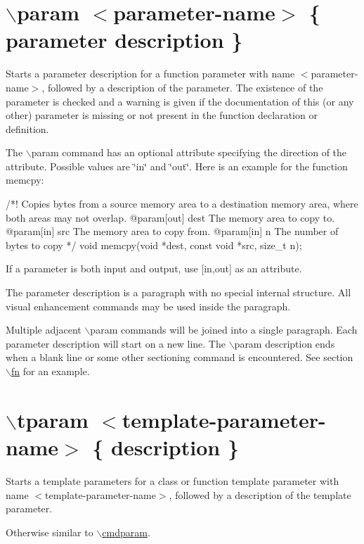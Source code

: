  \hypertarget{commands_cmdparam}{}\section{$\backslash$param $<$parameter-\/name$>$ \{ parameter description \}}\label{commands_cmdparam}
 Starts a parameter description for a function parameter with name $<$parameter-\/name$>$, followed by a description of the parameter. The existence of the parameter is checked and a warning is given if the documentation of this (or any other) parameter is missing or not present in the function declaration or definition.

The $\backslash$param command has an optional attribute specifying the direction of the attribute. Possible values are \char`\"{}in\char`\"{} and \char`\"{}out\char`\"{}. Here is an example for the function memcpy: 
\begin{DoxyCode}
/*!
 Copies bytes from a source memory area to a destination memory area,
 where both areas may not overlap.
 @param[out] dest The memory area to copy to.
 @param[in]  src  The memory area to copy from.
 @param[in]  n    The number of bytes to copy
 */
void memcpy(void *dest, const void *src, size_t n);
\end{DoxyCode}
 If a parameter is both input and output, use \mbox{[}in,out\mbox{]} as an attribute.

The parameter description is a paragraph with no special internal structure. All visual enhancement commands may be used inside the paragraph.

Multiple adjacent $\backslash$param commands will be joined into a single paragraph. Each parameter description will start on a new line. The $\backslash$param description ends when a blank line or some other sectioning command is encountered. See section \hyperlink{commands_cmdfn}{$\backslash$fn} for an example.



 \hypertarget{commands_cmdtparam}{}\section{$\backslash$tparam $<$template-\/parameter-\/name$>$ \{ description \}}\label{commands_cmdtparam}
 Starts a template parameters for a class or function template parameter with name $<$template-\/parameter-\/name$>$, followed by a description of the template parameter.

Otherwise similar to \hyperlink{commands_cmdparam}{$\backslash$cmdparam}.




